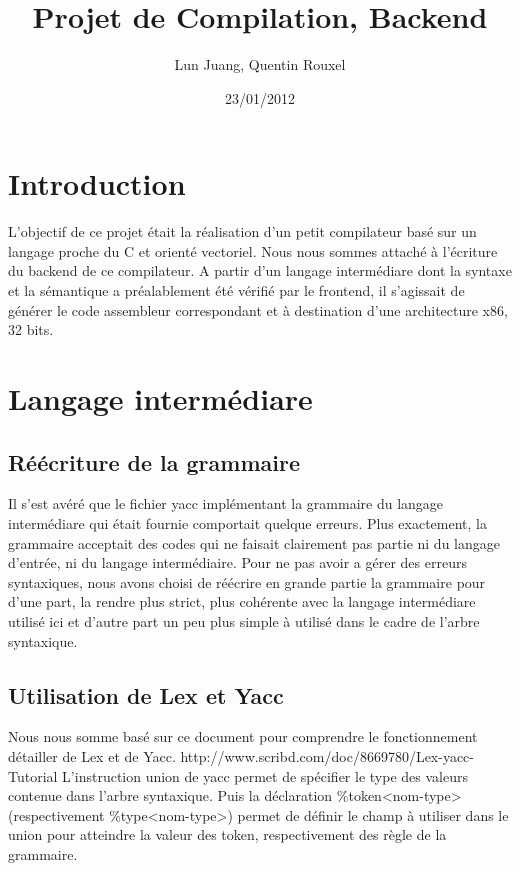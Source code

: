 \documentclass{article}
\title{Projet de Compilation, Backend}
\author{Lun Juang, Quentin Rouxel}
\date{23/01/2012}
\begin{document}
\maketitle{}

\section{Introduction}

L'objectif de ce projet était la réalisation d'un petit compilateur basé sur un langage proche du C et orienté vectoriel.
Nous nous sommes attaché à l'écriture du backend de ce compilateur. A partir d'un langage intermédiare dont la syntaxe et la sémantique
a préalablement été vérifié par le frontend, il s'agissait de générer le code assembleur correspondant et à destination d'une architecture
x86, 32 bits.

\section{Langage intermédiare}

\subsection{Réécriture de la grammaire}

Il s'est avéré que le fichier yacc implémentant la grammaire du langage intermédiare qui était fournie comportait quelque erreurs.
Plus exactement, la grammaire acceptait des codes qui ne faisait clairement pas partie ni du langage d'entrée, ni du langage intermédiaire.
Pour ne pas avoir a gérer des erreurs syntaxiques, nous avons choisi de réécrire en grande partie la grammaire 
pour d'une part, la rendre plus strict, plus cohérente avec la langage intermédiare utilisé ici et d'autre part un peu plus simple à
utilisé dans le cadre de l'arbre syntaxique.

\subsection{Utilisation de Lex et Yacc}

Nous nous somme basé sur ce document pour comprendre le fonctionnement détailler de Lex et de Yacc.
http://www.scribd.com/doc/8669780/Lex-yacc-Tutorial
L'instruction union de yacc permet de spécifier le type des valeurs contenue dans l'arbre syntaxique. Puis la déclaration
\%token<nom-type> (respectivement \%type<nom-type>) permet de définir le champ à utiliser dans le union pour atteindre la valeur des token, 
respectivement des règle de la grammaire.
\end{document}

